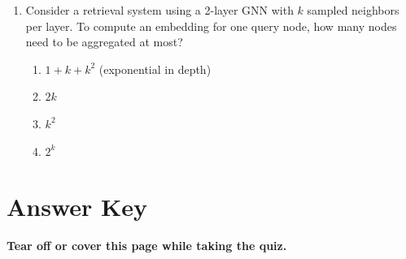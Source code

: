 \documentclass[12pt,a4paper]{article}
\begin{document}
\begin{enumerate}
\item Consider a retrieval system using a 2-layer GNN with $k$ sampled neighbors per layer. To compute an embedding for one query node, how many nodes need to be aggregated at most?
\begin{enumerate}[label=\Alph*)]
    \item $1 + k + k^2$ (exponential in depth)
    \item $2k$
    \item $k^2$
    \item $2^k$
\end{enumerate}

\end{enumerate}

\newpage
\section*{Answer Key}

\begin{center}
\textbf{Tear off or cover this page while taking the quiz.}
\end{center}

\vspace{1cm}
\end{document}
